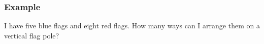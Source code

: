 \begin{frame}
  \frametitle{Example}

  I have five blue flags and eight red flags. How many ways can I
  arrange them on a vertical flag pole?

  
  
\end{frame}


